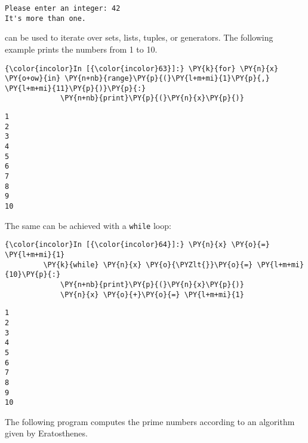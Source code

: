 \begin{Verbatim}[commandchars=\\\{\}]
Please enter an integer: 42
It's more than one.
\end{Verbatim}
 can be used to iterate over sets, lists, tuples, or
generators. The following example prints the numbers from 1 to 10.

\begin{Verbatim}[commandchars=\\\{\}]
{\color{incolor}In [{\color{incolor}63}]:} \PY{k}{for} \PY{n}{x} \PY{o+ow}{in} \PY{n+nb}{range}\PY{p}{(}\PY{l+m+mi}{1}\PY{p}{,} \PY{l+m+mi}{11}\PY{p}{)}\PY{p}{:}
             \PY{n+nb}{print}\PY{p}{(}\PY{n}{x}\PY{p}{)}
\end{Verbatim}


\begin{Verbatim}[commandchars=\\\{\}]
1
2
3
4
5
6
7
8
9
10
\end{Verbatim}
The same can be achieved with a \texttt{while} loop:

\begin{Verbatim}[commandchars=\\\{\}]
{\color{incolor}In [{\color{incolor}64}]:} \PY{n}{x} \PY{o}{=} \PY{l+m+mi}{1}
         \PY{k}{while} \PY{n}{x} \PY{o}{\PYZlt{}}\PY{o}{=} \PY{l+m+mi}{10}\PY{p}{:}
             \PY{n+nb}{print}\PY{p}{(}\PY{n}{x}\PY{p}{)}
             \PY{n}{x} \PY{o}{+}\PY{o}{=} \PY{l+m+mi}{1}
\end{Verbatim}


\begin{Verbatim}[commandchars=\\\{\}]
1
2
3
4
5
6
7
8
9
10
\end{Verbatim}
The following program computes the prime numbers according to an
algorithm given by Eratosthenes.

